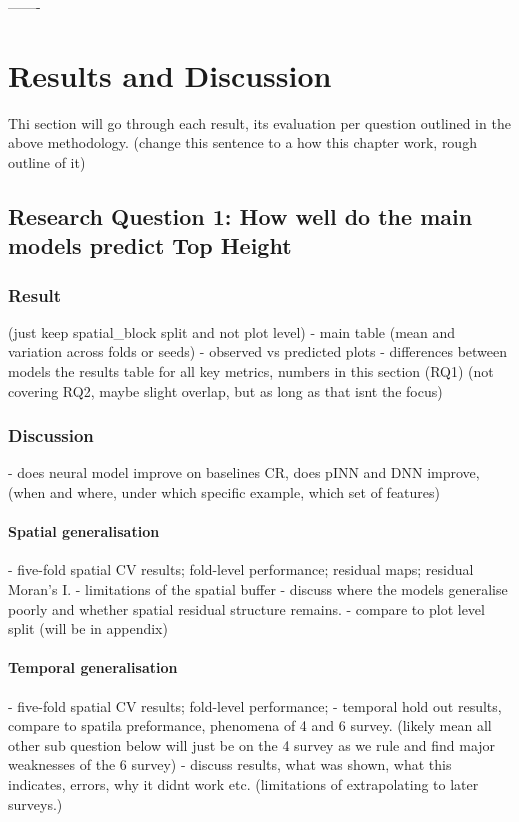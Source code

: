 -------
\chapter{Results and Discussion}
Thi section will go through each result, its evaluation per question outlined in the above methodology. (change this sentence to a how this chapter work, rough outline of it)

\section{Research Question 1: How well do the main models predict Top Height}

\subsection{Result} (just keep spatial\_block split and not plot level)
- main table (mean and variation across folds or seeds)
- observed vs predicted plots 
- differences between models 
the results table for all key metrics, numbers in this section (RQ1)  (not covering RQ2, maybe slight overlap, but as long as that isnt the focus)


\subsection{Discussion}
- does neural model improve on baselines CR, does pINN and DNN improve, (when and where, under which specific example, which set of features)

\subsubsection{Spatial generalisation}
- five-fold spatial CV results; fold-level performance; residual maps; residual Moran’s I.
- limitations of the spatial buffer
- discuss where the models generalise poorly and whether spatial residual structure remains.
- compare to plot level split (will be in appendix) 
\subsubsection{Temporal generalisation}
- five-fold spatial CV results; fold-level performance; 
- temporal hold out results, compare to spatila preformance, phenomena of 4 and 6 survey. (likely mean all other sub question below will just be on the 4 survey as we rule and find major weaknesses of the 6 survey) 
- discuss results, what was shown, what this indicates, errors, why it didnt work etc. (limitations of extrapolating to later surveys.) 
